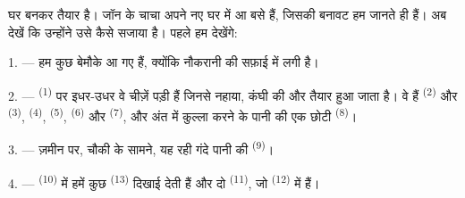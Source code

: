%
%

\VUsaut{6.0mm}
\VUsaut{1.4mm}
\VUsaut{0.4mm}
\VUsaut{2.2mm}

घर बनकर तैयार है। जॉन के चाचा अपने नए घर में आ बसे हैं, जिसकी बनावट हम जानते ही
हैं। अब देखें कि उन्होंने उसे कैसे सजाया है। पहले हम देखेंगे:

\VUsaut{3.0mm}

1. --- हम कुछ बेमौके आ गए हैं, क्योंकि नौकरानी  की सफ़ाई में लगी
है।

2. ---  \textsuperscript{(1)} पर इधर-उधर वे चीज़ें
पड़ी हैं जिनसे नहाया, कंघी की और तैयार हुआ जाता है। वे हैं 
\textsuperscript{(2)} और  \textsuperscript{(3)},
 \textsuperscript{(4)},  \textsuperscript{(5)},
 \textsuperscript{(6)} और  \textsuperscript{(7)}, और
अंत में कुल्ला करने के पानी की एक छोटी  \textsuperscript{(8)}।

3. --- ज़मीन पर, चौकी के सामने, यह रही गंदे पानी की 
\textsuperscript{(9)}।

4. ---  \textsuperscript{(10)} में हमें कुछ 
\textsuperscript{(13)} दिखाई देती हैं और दो  \textsuperscript{(11)},
जो  \textsuperscript{(12)} में हैं।

